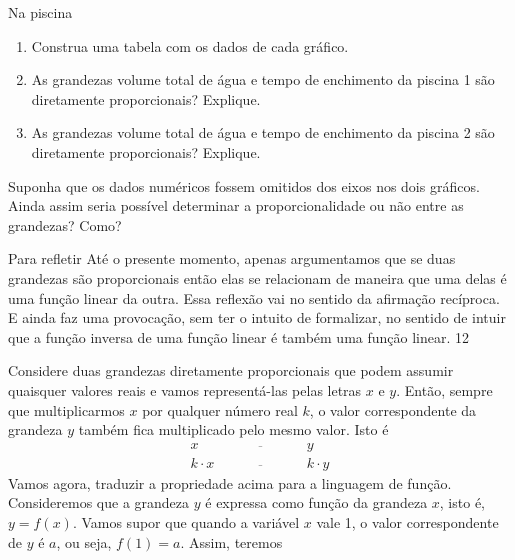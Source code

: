 \begin{task}{Na piscina}
\begin{figure}[H]
\end{figure}

\begin{enumerate}
\item {} 
Construa uma tabela com os dados de cada gráfico.

\item {} 
As grandezas volume total de água e tempo de enchimento da piscina 1 são diretamente proporcionais? Explique.

\item {} 
As grandezas volume total de água e tempo de enchimento da piscina 2 são diretamente proporcionais? Explique.

\end{enumerate}
\end{task}

\begin{reflection}

Suponha que os dados numéricos fossem omitidos dos eixos nos dois gráficos. Ainda assim seria possível determinar a proporcionalidade ou não entre as grandezas? Como?
\end{reflection}

\clearpage
\def\currentcolor{session4}
\begin{sugestions}{Para refletir}
{
  Até o presente momento, apenas argumentamos que se duas grandezas são proporcionais então elas se relacionam de maneira que uma delas é uma função linear da outra. Essa reflexão vai no sentido da afirmação recíproca. E ainda faz uma provocação, sem ter o intuito de formalizar, no sentido de intuir que a função inversa de uma função linear é também uma função linear.
}{1}{2}
\end{sugestions}

\label{\detokenize{AF107-1::doc}}\label{\detokenize{AF107-1:organizando-as-ideias-funcao-linear}}
Considere duas grandezas diretamente proporcionais que podem assumir quaisquer valores reais e vamos representá-las pelas letras \(x\) e \(y\). Então, sempre que multiplicarmos \(x\) por qualquer número real \(k\), o valor correspondente da grandeza \(y\) também fica multiplicado pelo mesmo valor. Isto é
\[\begin{array}{ccc}
x\quad &\overline{\quad \quad \quad}& \quad y \\
k\cdot x \quad &\overline{\quad \quad \quad}& \quad k\cdot y
  \end{array}\]
Vamos agora, traduzir a propriedade acima para a linguagem de função. Consideremos que a grandeza \(y\) é expressa como função da grandeza \(x\), isto é, \(y=f(x)\). Vamos supor que quando a variável $x$ vale 1, o valor correspondente de $y$ é $a$, ou seja, $f(1)=a$. Assim, teremos

